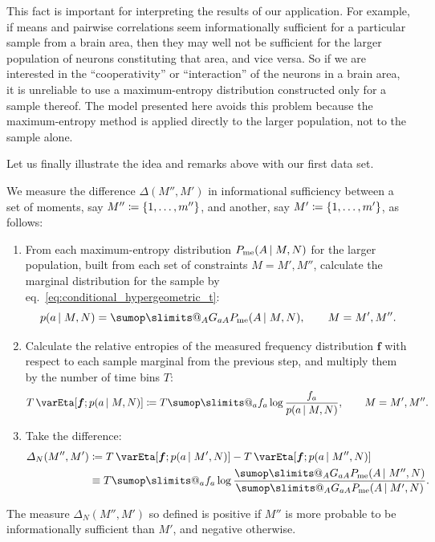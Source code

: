 \documentclass[\ifafour a4paper,12pt,\else a5paper,10pt,\fi%
onecolumn,oneside,article,%
british%
]{memoir}
\makeatletter
\theoremstyle{remark}
\theoremstyle{innote}
\def\sum{\DOTSI\sumop\slimits@}
\newcommand*{\citep}{\footcites}
\newcommand*{\defd}{\coloneqq}
\DeclarePairedDelimiter\set{\{}{\}}
\renewcommand*{\|}{\nonscript\,\vert\nonscript\;\mathopen{}}
\newcommand*{\eqn}{eq.}%
\newcommand*{\eg}{{e.g.}}
\newcommand*{\yG}{G}
\newcommand*{\yAv}{A}
\newcommand*{\yav}{a}
\newcommand*{\yff}{f}
\newcommand*{\yf}{\bm{\yff}}
\newcommand*{\ya}{\yav}%
\newcommand*{\yA}{\yAv}%
\newcommand*{\px}{P_{\text{me}}}
\newcommand*{\pxx}{p}
\newcommand*{\ydi}{\varDelta}
\newcommand*{\sh}{\mathrm{\varEta}}
\makeatother
\begin{document}
This fact is important for interpreting the results of our application. For
example, if means and pairwise correlations seem informationally sufficient
for a particular sample from a brain area, then they may well not be
sufficient for the larger population of neurons constituting that area, and
vice versa. So if we are interested in the \enquote{cooperativity} or
\enquote{interaction} of the neurons in a brain area, it is unreliable to
use a maximum-entropy distribution constructed only for a sample
thereof. %
The model presented here avoids this problem because the maximum-entropy
method is applied directly to the larger population, not to the sample
alone.

\bigskip

Let us finally illustrate the idea and remarks above with our first data set.

We measure the difference $\ydi(M'',M')$ in informational sufficiency
between a set of moments, say $M''\defd\set{1,\dotsc,m''}$, and another, say
$M'\defd \set{1,\dotsc,m'}$, as follows:
\begin{enumerate}[label=(\roman*)]
\item From each maximum-entropy distribution $\px(\yA \| M,N)$ for the
  larger population, built from each set of constraints $M=M',M''$,
  calculate the marginal distribution for the sample by
  \eqn~\eqref{eq:conditional_hypergeometric_t}:
\begin{equation}
  \label{eq:sample_marginal}
  \pxx(\ya \| M, N) = \sum_{\yA}\yG_{\ya \yA}\px(\yA \| M,N),
  \qquad M=M',M''.
\end{equation}
\item Calculate the relative entropies of the measured frequency
  distribution $\yf$ with respect to each sample marginal from the previous
  step, and multiply them by the number of time bins $T$:
  \begin{equation}
    \label{eq:relentropy_T}
    T\,\sh[\yf; \pxx(\ya \| M,N)] \defd
    T  \sum_{\ya} \yff_{\ya} \log\frac{\yff_{\ya}}{\pxx(\ya \| M,N)},
    \qquad M=M',M''.
  \end{equation}
\item Take the difference: 
\begin{equation}
  \label{eq:measure_suffic}
  \begin{split}
  \ydi_{N}(M'',M') &\defd
  T \,\sh[\yf; \pxx(\ya \| M',N)]
  -
  T \,\sh[\yf; \pxx(\ya \| M'',N)]
  \\ &\equiv
T  \sum_{\ya} \yff_{\ya} \log\frac{
  \sum_{\yA}\yG_{\ya\yA}\px(\yA \| M'',N)}{
  \sum_{\yA}\yG_{\ya\yA}\px(\yA \| M',N)}.
\end{split}
\end{equation}
\end{enumerate}
The measure $\ydi_{N}(M'',M')$ so defined is positive if $M''$ is more
probable to be informationally sufficient than $M'$, and negative
otherwise.
\end{document}
